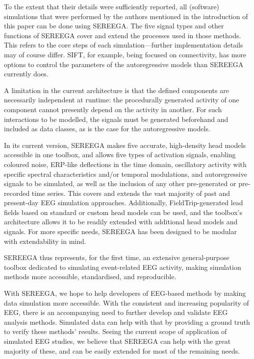 To the extent that their details were sufficiently reported, all (software) simulations that were performed by the authors mentioned in the introduction of this paper can be done using SEREEGA. The five signal types and other functions of SEREEGA cover and extend the processes used in those methods. This refers to the core steps of each simulation---further implementation details may of course differ. SIFT, for example, being focused on connectivity, has more options to control the parameters of the autoregressive models than SEREEGA currently does.

A limitation in the current architecture is that the defined components are necessarily independent at runtime: the procedurally generated activity of one component cannot presently depend on the activity in another. For such interactions to be modelled, the signals must be generated beforehand and included as data classes, as is the case for the autoregressive models.

In its current version, SEREEGA makes five accurate, high-density head models accessible in one toolbox, and allows five types of activation signals, enabling coloured noise, ERP-like deflections in the time domain, oscillatory activity with specific spectral characteristics and/or temporal modulations, and autoregressive signals to be simulated, as well as the inclusion of any other pre-generated or pre-recorded time series. This covers and extends the vast majority of past and present-day EEG simulation approaches. Additionally, FieldTrip-generated lead fields based on standard or custom head models can be used, and the toolbox's architecture allows it to be readily extended with additional head models and signals. For more specific needs, SEREEGA has been designed to be modular with extendability in mind.

SEREEGA thus represents, for the first time, an extensive general-purpose toolbox dedicated to simulating event-related EEG activity, making simulation methods more accessible, standardised, and reproducible. 

With SEREEGA, we hope to help developers of EEG-based methods by making data simulation more accessible. With the consistent and increasing popularity of EEG, there is an accompanying need to further develop and validate EEG analysis methods. Simulated data can help with that by providing a ground truth to verify these methods' results. Seeing the current scope of application of simulated EEG studies, we believe that SEREEGA can help with the great majority of these, and can be easily extended for most of the remaining needs. 


